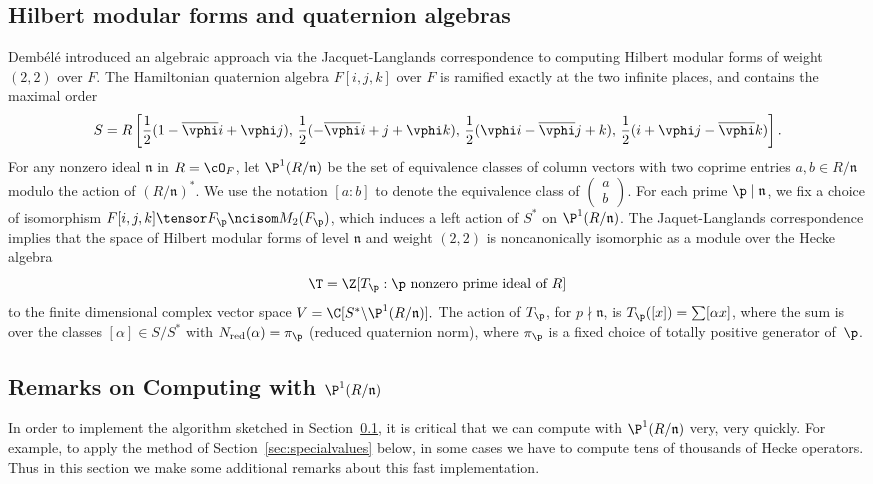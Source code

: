 \documentclass{amsart}
\newcommand{\n}{\mathfrak{n}}
\newcommand{\dembele}{Demb\'el{\'e}\xspace}
\begin{document}
\subsection{Hilbert modular forms and quaternion 
algebras}\label{sec:dembele}
\dembele \cite{dembele:hilbert5} introduced an algebraic approach via
the Jacquet-Langlands correspondence to computing Hilbert modular
forms of weight $(2,2)$ over $F$.  The Hamiltonian quaternion algebra
$F[i,j,k]$ over $F$ is ramified exactly at the two infinite places,
and contains the maximal order
$$
 S = R\left[\frac{1}{2}(1-\overline{\vphi} i + \vphi j),\,
       \frac{1}{2}(-\overline{\vphi} i + j + \vphi k),\,
       \frac{1}{2}(\vphi i - \overline{\vphi} j + k), \,
       \frac{1}{2}(i + \vphi j - \overline{\vphi} k)\right].
$$
For any nonzero ideal $\n$ in $R=\cO_F$,
let $\P^1(R/\n)$ be the set of equivalence classes of
 column vectors with two coprime entries $a,b \in R/\n$ modulo the
 action of $(R/\n)^*$.  We use the notation $[a:b]$
to denote the equivalence class of 
$\left(\begin{smallmatrix}a\\b\end{smallmatrix}\right)$.
For each prime $\p\mid \n$, we fix a choice of isomorphism
$F[i,j,k]\tensor F_{\p} \ncisom M_2(F_{\p})$, which induces a left
action of $S^*$ on $\P^1(R/\n)$. The Jaquet-Langlands correspondence implies that
the space of Hilbert modular forms of level $\n$ and weight $(2,2)$ is
noncanonically isomorphic as a module over the Hecke algebra
$$\T=\Z[T_\p :  \p \text{ nonzero prime ideal of }R]$$ 
to the finite dimensional complex vector space $ V = \C[S^* \backslash
\P^1(R/\n)].  $ The action of $T_{\p}$, for $p\nmid \n$, is
$T_{\p}([x]) = \sum [\alpha x]$, where the sum is over the classes
$[\alpha]\in S/S^*$ with $N_{\text{red}}(\alpha)=\pi_{\p}$ (reduced quaternion norm),
where $\pi_{\p}$ is a fixed choice of totally positive generator of~$\p$.

\subsection{Remarks on Computing with $\P^1(R/\n)$}\label{sec:p1rn}

In order to implement the algorithm sketched in
Section~\ref{sec:dembele}, it is critical that we can compute with
$\P^1(R/\n)$ very, very quickly.  For example, to apply the method of
Section~\ref{sec:specialvalues} below, in some cases we have to
compute tens of thousands of Hecke operators.  Thus in this section we
make some additional remarks about this fast
implementation.
\end{document}

